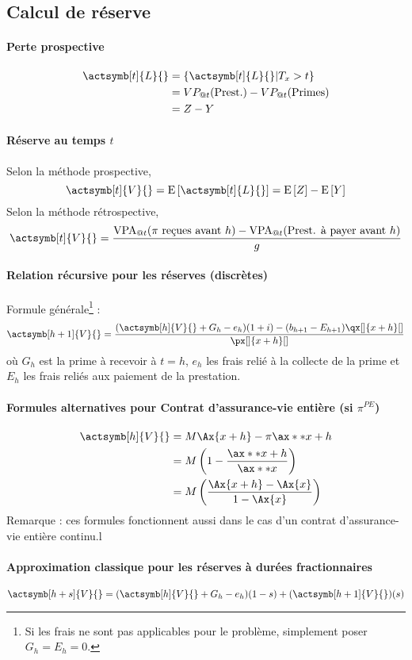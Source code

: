 \documentclass[10pt, french]{article}
\begin{document}
\begin{multicols*}{3}
\section{Calcul de réserve}
\paragraph{Perte prospective}
\begin{align*}
\actsymb[t]{L}{} & = \{ \actsymb[t]{L}{} | T_x > t \} \\
& = VP_{@t}(\text{Prest.}) - VP_{@t}(\text{Primes}) \\
& = Z - Y
\end{align*}

\paragraph{Réserve au temps $t$}
Selon la méthode prospective,
\[\actsymb[t]{V}{} = \esp{\actsymb[t]{L}{}} = \esp{Z} - \esp{Y}\]
Selon la méthode rétrospective,
\[\actsymb[t]{V}{} = \frac{\text{VPA}_{@t}(\text{$\pi$ reçues avant $h$}) - \text{VPA}_{@t}(\text{Prest. à payer avant $h$})}{g}\]

\paragraph{Relation récursive pour les réserves (discrètes)}
Formule générale\footnote{Si les frais ne sont pas applicables pour le problème, simplement poser $G_h = E_h = 0$.} : 
\[\actsymb[h+1]{V}{} = \frac{(\actsymb[h]{V}{} + G_h - e_h)(1+i) - (b_{h+1} - E_{h+1}) \qx[]{x+h}[]}{\px[]{x+h}[]}\]
où $G_h$ est la prime à recevoir à $t=h$, $e_h$ les frais relié à la collecte de la prime et $E_h$ les frais reliés aux paiement de la prestation.

\paragraph{Formules alternatives pour Contrat d'assurance-vie entière (si $\pi^{PE}$)}
\begin{align*}
\actsymb[h]{V}{} & = M \Ax{x+h} - \pi \ax**{x+h} \\
& = M \left( 1 - \frac{\ax**{x+h}}{\ax**{x}} \right) \\
& = M \left( \frac{\Ax{x+h} - \Ax{x}}{1 - \Ax{x}} \right)
\end{align*}
 Remarque : ces formules fonctionnent aussi dans le cas d'un contrat d'assurance-vie entière continu.l
 
 \paragraph{Approximation classique pour les réserves à durées fractionnaires}
 \[\actsymb[h+s]{V}{} = (\actsymb[h]{V}{} + G_h - e_h)(1-s) + (\actsymb[h+1]{V}{})(s) \]











\end{multicols*}
\end{document}
